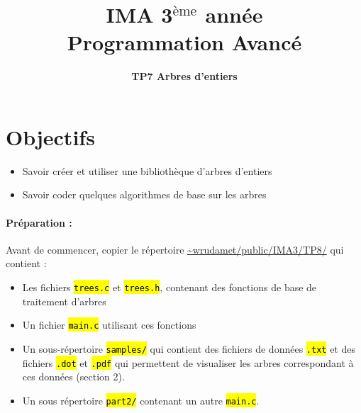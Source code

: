 \documentclass[final, pdftex, a4paper, openbib, ]{article}
\title{IMA 3$^{\mbox{\`eme}}$ année\\ Programmation Avancé
}
\author{\huge \textbf{TP7 Arbres d'entiers}}
\date{}
\let\OldTexttt\texttt
\renewcommand{\texttt}[1]{\OldTexttt{\hl{#1}}}
\begin{document}
\posttitle{\par\end{center}}
\setlength{\droptitle}{-45pt}
\maketitle

\vspace{-1.7cm}
\section{Objectifs}

\begin{itemize}
	\item Savoir créer et utiliser une bibliothèque d'arbres d'entiers
	\item Savoir coder quelques algorithmes de base sur les arbres
\end{itemize}


\paragraph{Préparation : } Avant de commencer, copier le répertoire \url{~wrudamet/public/IMA3/TP8/} qui contient :

\begin{itemize}
	\item Les fichiers \texttt{trees.c} et \texttt{trees.h}, contenant des fonctions de base de traitement d'arbres
	\item Un fichier \texttt{main.c} utilisant ces fonctions
	\item Un sous-répertoire \texttt{samples/} qui contient des fichiers de données \texttt{.txt} et des fichiers \texttt{.dot} et \texttt{.pdf} qui permettent de visualiser les arbres correspondant à ces données (section 2).
	\item Un sous répertoire \texttt{part2/} contenant un autre \texttt{main.c}.
\end{itemize}
\end{document}
